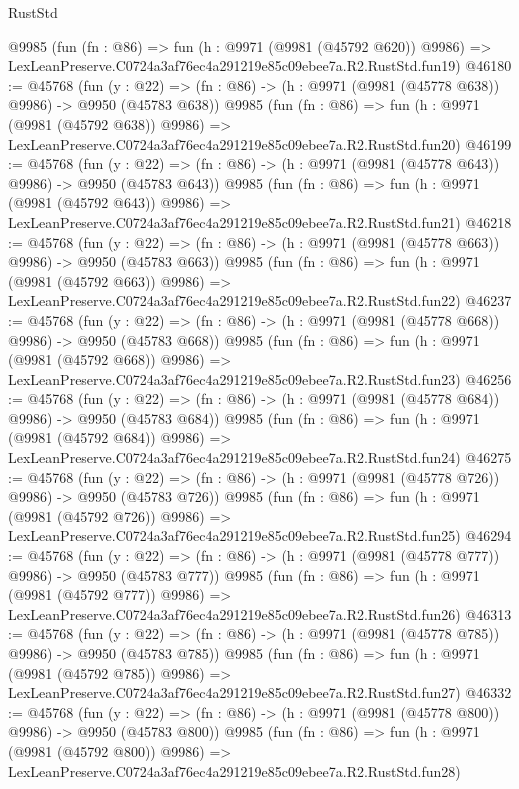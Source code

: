 \begin{lexlean}{RustStd}
\begin{coremodule}
    @9985
    (fun (fn : @86) =>
    fun (h : @9971 (@9981 (@45792 @620)) @9986) =>
    LexLeanPreserve.C0724a3af76ec4a291219e85c09ebee7a.R2.RustStd.fun19)
@46180 := @45768
    (fun (y : @22) => (fn : @86) -> (h : @9971 (@9981 (@45778 @638)) @9986) -> @9950 (@45783 @638))
    @9985
    (fun (fn : @86) =>
    fun (h : @9971 (@9981 (@45792 @638)) @9986) =>
    LexLeanPreserve.C0724a3af76ec4a291219e85c09ebee7a.R2.RustStd.fun20)
@46199 := @45768
    (fun (y : @22) => (fn : @86) -> (h : @9971 (@9981 (@45778 @643)) @9986) -> @9950 (@45783 @643))
    @9985
    (fun (fn : @86) =>
    fun (h : @9971 (@9981 (@45792 @643)) @9986) =>
    LexLeanPreserve.C0724a3af76ec4a291219e85c09ebee7a.R2.RustStd.fun21)
@46218 := @45768
    (fun (y : @22) => (fn : @86) -> (h : @9971 (@9981 (@45778 @663)) @9986) -> @9950 (@45783 @663))
    @9985
    (fun (fn : @86) =>
    fun (h : @9971 (@9981 (@45792 @663)) @9986) =>
    LexLeanPreserve.C0724a3af76ec4a291219e85c09ebee7a.R2.RustStd.fun22)
@46237 := @45768
    (fun (y : @22) => (fn : @86) -> (h : @9971 (@9981 (@45778 @668)) @9986) -> @9950 (@45783 @668))
    @9985
    (fun (fn : @86) =>
    fun (h : @9971 (@9981 (@45792 @668)) @9986) =>
    LexLeanPreserve.C0724a3af76ec4a291219e85c09ebee7a.R2.RustStd.fun23)
@46256 := @45768
    (fun (y : @22) => (fn : @86) -> (h : @9971 (@9981 (@45778 @684)) @9986) -> @9950 (@45783 @684))
    @9985
    (fun (fn : @86) =>
    fun (h : @9971 (@9981 (@45792 @684)) @9986) =>
    LexLeanPreserve.C0724a3af76ec4a291219e85c09ebee7a.R2.RustStd.fun24)
@46275 := @45768
    (fun (y : @22) => (fn : @86) -> (h : @9971 (@9981 (@45778 @726)) @9986) -> @9950 (@45783 @726))
    @9985
    (fun (fn : @86) =>
    fun (h : @9971 (@9981 (@45792 @726)) @9986) =>
    LexLeanPreserve.C0724a3af76ec4a291219e85c09ebee7a.R2.RustStd.fun25)
@46294 := @45768
    (fun (y : @22) => (fn : @86) -> (h : @9971 (@9981 (@45778 @777)) @9986) -> @9950 (@45783 @777))
    @9985
    (fun (fn : @86) =>
    fun (h : @9971 (@9981 (@45792 @777)) @9986) =>
    LexLeanPreserve.C0724a3af76ec4a291219e85c09ebee7a.R2.RustStd.fun26)
@46313 := @45768
    (fun (y : @22) => (fn : @86) -> (h : @9971 (@9981 (@45778 @785)) @9986) -> @9950 (@45783 @785))
    @9985
    (fun (fn : @86) =>
    fun (h : @9971 (@9981 (@45792 @785)) @9986) =>
    LexLeanPreserve.C0724a3af76ec4a291219e85c09ebee7a.R2.RustStd.fun27)
@46332 := @45768
    (fun (y : @22) => (fn : @86) -> (h : @9971 (@9981 (@45778 @800)) @9986) -> @9950 (@45783 @800))
    @9985
    (fun (fn : @86) =>
    fun (h : @9971 (@9981 (@45792 @800)) @9986) =>
    LexLeanPreserve.C0724a3af76ec4a291219e85c09ebee7a.R2.RustStd.fun28)

\end{coremodule}
\end{lexlean}
